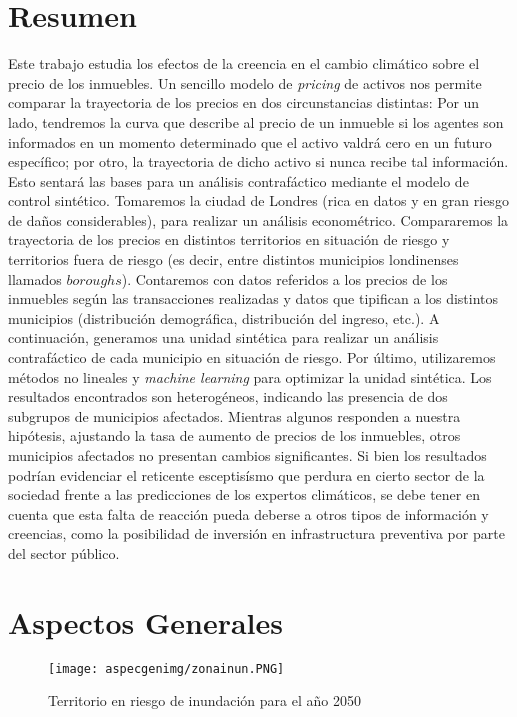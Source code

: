 \documentclass[12pt]{article}
\begin{document}
\section*{Resumen}
\label{sec:Resumen}
Este trabajo estudia los efectos de la creencia en el cambio climático sobre el precio de los inmuebles. Un sencillo modelo de \textit{pricing} de activos nos permite comparar la trayectoria de los precios en dos circunstancias distintas: Por un lado, tendremos la curva que describe al precio de un inmueble si los agentes son informados en un momento determinado que el activo valdrá cero en un futuro específico; por otro, la trayectoria de dicho activo si nunca recibe tal información. Esto sentará las bases para un análisis contrafáctico mediante el modelo de control sintético. Tomaremos la ciudad de Londres (rica en datos y en gran riesgo de daños considerables), para realizar un análisis econométrico. Compararemos la trayectoria de los precios en distintos territorios en situación de riesgo y territorios fuera de riesgo (es decir, entre distintos municipios londinenses llamados {$boroughs$}). Contaremos con datos referidos a los precios de los inmuebles según las transacciones realizadas y datos que tipifican a los distintos municipios (distribución demográfica, distribución del ingreso, etc.). A continuación, generamos una unidad sintética para realizar un análisis contrafáctico de cada municipio en situación de riesgo. Por último, utilizaremos métodos no lineales y \textit{machine learning} para optimizar la unidad sintética. Los resultados encontrados son heterogéneos, indicando las presencia de dos subgrupos de municipios afectados. Mientras algunos responden a nuestra hipótesis, ajustando la tasa de aumento de precios de los inmuebles, otros municipios afectados no presentan cambios significantes. Si bien los resultados podrían evidenciar el reticente esceptisísmo que perdura en cierto sector de la sociedad frente a las predicciones de los expertos climáticos, se debe tener en cuenta que esta falta de reacción pueda deberse a otros tipos de información y creencias, como la posibilidad de inversión en infrastructura preventiva por parte del sector público. 
\newpage
\section{Aspectos Generales}
\label{sec:Generales}

\begin{figure}[H]
\texttt{[image: aspecgenimg/zonainun.PNG]}
\caption*{Territorio en riesgo de inundación para el año 2050 \footnotemark }
\end{figure}
\end{document}
